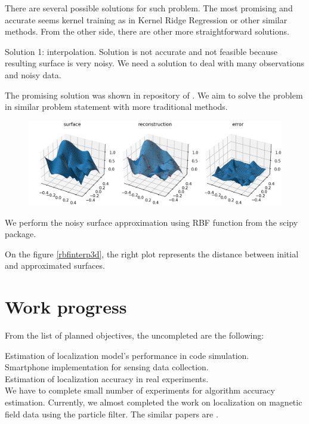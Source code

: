 \documentclass[a4paper, 12pt]{article}
\begin{document}
There are  several possible solutions for such problem. The most promising and accurate seems kernel training as in Kernel Ridge Regression or other similar methods. From the other side, there are other more straightforward solutions.

Solution 1: interpolation. Solution is not accurate and not feasible because resulting surface is very noisy. We need a solution to deal with many observations and noisy data.

The promising solution was shown in repository of \cite{Surface_approximation_GP}. We aim to solve the problem in similar problem statement with more traditional methods.




\begin{figure}
	\centering
	\includegraphics[width=1.0\linewidth]{images/rbfinterp3d}
	\caption{}
	\label{fig:rbfinterp3d}
\end{figure}

We perform the noisy surface approximation using RBF function from the scipy package.

On the figure \ref{rbfinterp3d}, the right plot represents the distance between initial and approximated surfaces.


\section{Work progress}

From the list of planned objectives, the uncompleted are the following:

Estimation of localization model’s performance in code simulation. \\
Smartphone implementation for sensing data collection. \\
Estimation of localization accuracy in real experiments. \\

We have to complete small number of experiments for algorithm accuracy estimation. 
Currently, we almost completed the work on localization on magnetic field data using the particle filter. The similar papers are \cite{Grand20123AxisMF, 7809951}.
\end{document}
